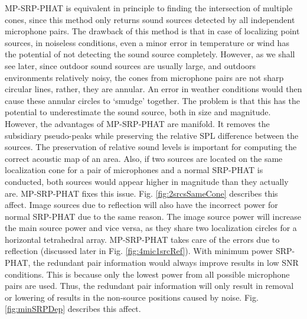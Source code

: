 MP-SRP-PHAT is equivalent in principle to finding the intersection of multiple cones, since this method only returns sound sources detected by all independent microphone pairs. The drawback of this method is that in case of localizing point sources, in noiseless conditions, even a minor error in temperature or wind has the potential of not detecting the sound source completely. However, as we shall see later, since outdoor sound sources are usually large, and outdoors environments relatively noisy, the cones from microphone pairs are not sharp circular lines, rather, they are annular. An error in weather conditions would then cause these annular circles to `smudge' together. The problem is that this has the potential to underestimate the sound source, both in size and magnitude. However, the advantages of MP-SRP-PHAT are manifold. It removes the subsidiary pseudo-peaks while preserving the relative SPL difference between the sources. The preservation of relative sound levels is important for computing the correct acoustic map of an area. Also, if two sources are located on the same localization cone for a pair of microphones and a normal SRP-PHAT is conducted, both sources would appear higher in magnitude than they actually are. MP-SRP-PHAT fixes this issue. Fig. \ref{fig:2srcsSameCone} describes this affect. Image sources due to reflection will also have the incorrect power for normal SRP-PHAT due to the same reason. The image source power will increase the main source power and vice versa, as they share two localization circles for a horizontal tetrahedral array. MP-SRP-PHAT takes care of the errors due to reflection (discussed later in Fig. \ref{fig:4mic1srcRef}).
With minimum power SRP-PHAT, the redundant pair information would always improve results in low SNR conditions. This is because only the lowest power from all possible microphone pairs are used. Thus, the redundant pair information will only result in removal or lowering of results in the non-source positions caused by noise. Fig. \ref{fig:minSRPDep} describes this affect. 
